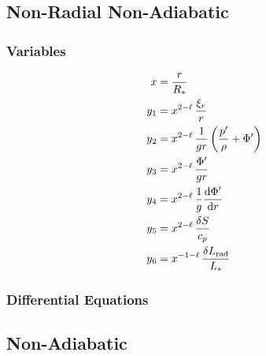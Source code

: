 \documentclass[fleqn]{article}
\newcommand{\diff}{\ensuremath{\mathrm{d}}}
\newcommand{\Rstar}{\ensuremath{R_{\ast}}}
\newcommand{\Lrad}{\ensuremath{L_{\rm rad}}}
\newcommand{\Lstar}{\ensuremath{L_{\ast}}}
\begin{document}

\newpage

\subsection*{Non-Radial Non-Adiabatic}

\subsubsection*{Variables}

\begin{align*}
x     &= \frac{r}{\Rstar} \\
y_{1} &= x^{2-\ell}\, \frac{\xi_{r}}{r} \\
y_{2} &= x^{2-\ell}\, \frac{1}{gr} \left( \frac{p'}{\rho} + \Phi' \right)\\
y_{3} &= x^{2-\ell}\, \frac{\Phi'}{gr}\\
y_{4} &= x^{2-\ell}\, \frac{1}{g} \frac{\diff \Phi'}{\diff r}\\
y_{5} &= x^{2-\ell}\, \frac{\delta S}{c_{p}}\\
y_{6} &= x^{-1-\ell}\, \frac{\delta \Lrad}{\Lstar}
\end{align*}

\subsubsection*{Differential Equations}

\subsection*{Non-Adiabatic}
\end{document}
